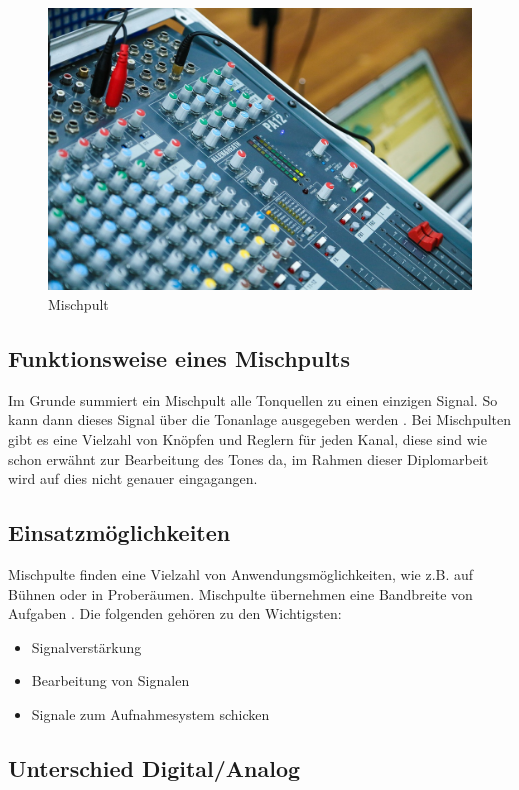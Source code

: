 \begin{figure}[H]
	\centering
	\includegraphics[width=0.8\linewidth]{images/mischpult.jpg}
	\caption[Mischpult]{Mischpult}
	\label{fig:Mischpult}
\end{figure}

\subsection{Funktionsweise eines Mischpults}
Im Grunde summiert ein Mischpult alle Tonquellen zu einen einzigen Signal. So kann dann dieses Signal über die Tonanlage ausgegeben werden \textcite{MischpultErklaerung}. Bei Mischpulten gibt es eine Vielzahl von Knöpfen und Reglern für jeden Kanal, diese sind wie schon erwähnt zur Bearbeitung des Tones da, im Rahmen dieser Diplomarbeit wird auf dies nicht genauer eingagangen. \\


\subsection{Einsatzmöglichkeiten}
Mischpulte finden eine Vielzahl von Anwendungsmöglichkeiten, wie z.B. auf Bühnen oder in Proberäumen. Mischpulte übernehmen eine Bandbreite von Aufgaben \textcite{MischpultVerwendungszweck}. Die folgenden gehören zu den Wichtigsten:
\begin{itemize}
	\item Signalverstärkung
	\item Bearbeitung von Signalen
	\item Signale zum Aufnahmesystem schicken
\end{itemize}


\subsection{Unterschied Digital/Analog}
